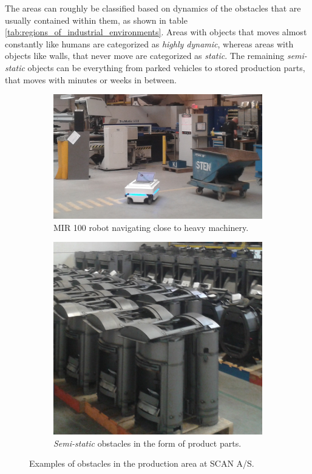 The areas can roughly be classified based on dynamics of the obstacles that are usually contained within them, as shown in table \ref{tab:regions_of_industrial_environments}. Areas with objects that moves almost constantly like humans are categorized as \textit{highly dynamic}, whereas areas with objects like walls, that never move are categorized as \textit{static}. The remaining \textit{semi-static} objects can be everything from parked vehicles to stored production parts, that moves with minutes or weeks in between. 

\begin{figure}[htbp]
	\centering
	\begin{subfigure}[t]{0.6\textwidth}
		\includegraphics[width=1.0\textwidth]{chapters/mapping_of_dynamic_areas/figures/scan-mir}	
		\caption{MIR 100 robot navigating close to heavy machinery.}
		\label{fig:scan-mir}
	\end{subfigure}
	\begin{subfigure}[t]{0.3875\textwidth}
		\includegraphics[width=1.0\textwidth]{chapters/mapping_of_dynamic_areas/figures/scan-semi-static-obstacles}
		\caption{\textit{Semi-static} obstacles in the form of product parts.}
		\label{fig:scan-semi-static-obstacles}
	\end{subfigure}
	\caption{Examples of obstacles in the production area at SCAN A/S.}
\end{figure}

